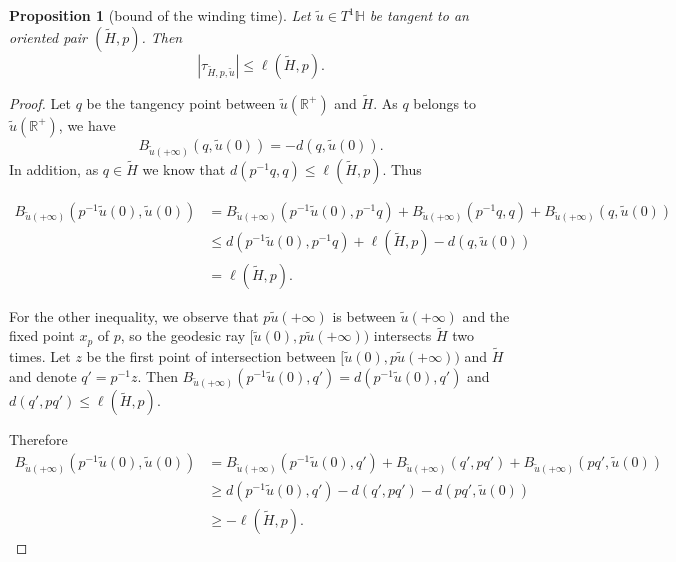 \documentclass[a4paper,english,reqno]{amsart}
\newcommand{\R}{\mathbb{R}}
\renewcommand{\H}{\mathbb{H}}
\newtheorem{proposition}{Proposition}
\theoremstyle{definition}
\numberwithin{equation}{section}
\begin{document}
 \begin{proposition}[bound of the winding time]\label{bound_wind}
 	Let $\tilde u\in T^1 \H$ be tangent to an oriented pair $(\tilde H, p)$.  	
 	Then
 	\[
 	\left| \tau_{\tilde H, p,\tilde u} \right| \leq \ell(\tilde H, p).
 	\]
 	
 \end{proposition}
 \begin{proof}
 	Let $q$ be the tangency point between $\tilde u (\mathbb{R}^+)$ and $\tilde H$.
 	As $q$ belongs to $\tilde u(\R^+)$, we have
 	$$
 	B_{\tilde u(+\infty)}(q,\tilde u(0))=-d(q,\tilde u(0)).
 	$$
 	In addition, as $q\in \tilde H$ we know that $d(p^{-1}q,q)\le \ell(\tilde H, p)$. Thus
 	
 	\begin{align*}
 		B_{\tilde u(+\infty)}(p^{-1}\tilde u(0),\tilde u(0)) 
 		& =  B_{\tilde u(+\infty)}(p^{-1}\tilde u(0),p^{-1}q)+  
 		B_{\tilde u(+\infty)}(p^{-1}q,q) +B_{\tilde u(+\infty)}(q,\tilde u(0)) \\
 		& \leq  d(p^{-1}\tilde u(0),p^{-1}q)+\ell(\tilde H,p)-d(q,\tilde u(0))\\
 		& = \ell(\tilde H, p).
 	\end{align*}
 	
 	For the other inequality, we observe that $p \tilde u (+\infty)$ is between $\tilde u (+ \infty)$ and the fixed point $x_p$ of $p$, so the geodesic ray $[\tilde u(0), p \tilde u(+\infty))$ intersects $\tilde H$ two times. Let $z$ be the first point of intersection between $[\tilde u(0), p \tilde u(+\infty))$ and $\tilde H$ and denote $q'=p^{-1} z$.  	
 	Then $B_{\tilde u(+\infty)}(p^{-1}\tilde u(0),q')=d(p^{-1}\tilde u(0),q')$ and $d(q',p q')\le \ell(\tilde H,p)$. 
 	
 	Therefore 	
 	\begin{align*}
 		B_{\tilde u(+\infty)}(p^{-1}\tilde u(0),\tilde u(0)) &= B_{\tilde u(+\infty)}(p^{-1}\tilde u(0),q')+B_{\tilde u(+\infty)}(q',p q')+B_{\tilde u(+\infty) }(p q',\tilde u(0)) \\
 		& \geq d(p^{-1}\tilde u(0),q')-d(q',p q')-d(p q',\tilde u(0))\\
 		&\ge - \ell (\tilde H, p).
 	\end{align*}
 \end{proof}
 
 
 
\end{document}
